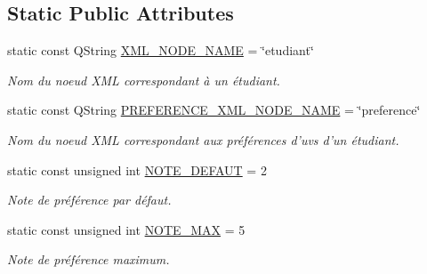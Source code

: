 \subsection*{Static Public Attributes}
\begin{DoxyCompactItemize}
\item 
\hypertarget{classEtudiant_ac25234ddf60108a99bbbea445f19abb6}{static const Q\+String \hyperlink{classEtudiant_ac25234ddf60108a99bbbea445f19abb6}{X\+M\+L\+\_\+\+N\+O\+D\+E\+\_\+\+N\+A\+M\+E} = \char`\"{}etudiant\char`\"{}}\label{classEtudiant_ac25234ddf60108a99bbbea445f19abb6}

\begin{DoxyCompactList}\small\item\em Nom du noeud X\+M\+L correspondant à un étudiant. \end{DoxyCompactList}\item 
\hypertarget{classEtudiant_a1b797bf85c3a7910f75e3cea5d4d1d1c}{static const Q\+String \hyperlink{classEtudiant_a1b797bf85c3a7910f75e3cea5d4d1d1c}{P\+R\+E\+F\+E\+R\+E\+N\+C\+E\+\_\+\+X\+M\+L\+\_\+\+N\+O\+D\+E\+\_\+\+N\+A\+M\+E} = \char`\"{}preference\char`\"{}}\label{classEtudiant_a1b797bf85c3a7910f75e3cea5d4d1d1c}

\begin{DoxyCompactList}\small\item\em Nom du noeud X\+M\+L correspondant aux préférences d'uvs d'un étudiant. \end{DoxyCompactList}\item 
\hypertarget{classEtudiant_afeee33e22bb1086fa13a2d9717343ff7}{static const unsigned int \hyperlink{classEtudiant_afeee33e22bb1086fa13a2d9717343ff7}{N\+O\+T\+E\+\_\+\+D\+E\+F\+A\+U\+T} = 2}\label{classEtudiant_afeee33e22bb1086fa13a2d9717343ff7}

\begin{DoxyCompactList}\small\item\em Note de préférence par défaut. \end{DoxyCompactList}\item 
\hypertarget{classEtudiant_a4c4570e87c631b0ec36880386f7bce8f}{static const unsigned int \hyperlink{classEtudiant_a4c4570e87c631b0ec36880386f7bce8f}{N\+O\+T\+E\+\_\+\+M\+A\+X} = 5}\label{classEtudiant_a4c4570e87c631b0ec36880386f7bce8f}

\begin{DoxyCompactList}\small\item\em Note de préférence maximum. \end{DoxyCompactList}\end{DoxyCompactItemize}


